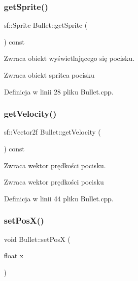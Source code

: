 \subsubsection{\texorpdfstring{get\+Sprite()}{getSprite()}}
{\footnotesize\ttfamily sf\+::\+Sprite Bullet\+::get\+Sprite (\begin{DoxyParamCaption}{ }\end{DoxyParamCaption}) const}



Zwraca obiekt wyświetlającego się pocisku. 

\begin{DoxyReturn}{Zwraca}
obiekt sprite\textquotesingle{}a pocisku 
\end{DoxyReturn}


Definicja w linii 28 pliku Bullet.\+cpp.

\mbox{\label{class_bullet_a1b48210b12476530fcc4da1baf6cf44c}} 
\subsubsection{\texorpdfstring{get\+Velocity()}{getVelocity()}}
{\footnotesize\ttfamily sf\+::\+Vector2f Bullet\+::get\+Velocity (\begin{DoxyParamCaption}{ }\end{DoxyParamCaption}) const}



Zwraca wektor prędkości pocisku. 

\begin{DoxyReturn}{Zwraca}
wektor prędkości pocisku 
\end{DoxyReturn}


Definicja w linii 44 pliku Bullet.\+cpp.

\mbox{\label{class_bullet_a3e9ef53d97f7f26289b2a6a7a62b2184}} 
\subsubsection{\texorpdfstring{set\+Pos\+X()}{setPosX()}}
{\footnotesize\ttfamily void Bullet\+::set\+PosX (\begin{DoxyParamCaption}\item[{float}]{x }\end{DoxyParamCaption})}



